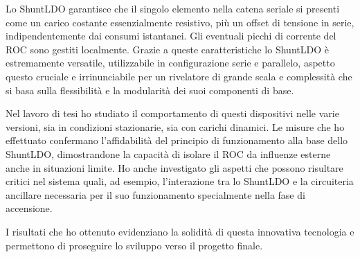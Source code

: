 \documentclass[a4paper,12pt,italian]{article}
\begin{document}
Lo ShuntLDO garantisce che il singolo elemento nella catena seriale si presenti come un carico costante essenzialmente resistivo, pi\`u un offset di tensione in serie, indipendentemente dai consumi istantanei. Gli eventuali picchi di corrente del ROC sono gestiti localmente.
Grazie a queste caratteristiche lo ShuntLDO \`e estremamente versatile, utilizzabile in configurazione serie e parallelo, aspetto questo cruciale e irrinunciabile per un rivelatore di grande scala e complessit\`a che si basa sulla flessibilit\`a e la modularit\`a dei suoi componenti di base.

 

Nel lavoro di tesi ho studiato il comportamento di questi dispositivi nelle varie versioni, sia in condizioni stazionarie, sia con carichi dinamici.
Le misure che ho effettuato confermano l'affidabilità del principio di funzionamento alla base dello ShuntLDO, dimostrandone la capacità di isolare il ROC da influenze esterne anche in situazioni limite. Ho anche investigato gli aspetti che possono risultare critici nel sistema quali, ad esempio, l'interazione tra lo ShuntLDO e la circuiteria ancillare necessaria per il suo funzionamento specialmente nella fase di accensione.

I risultati che ho ottenuto evidenziano la solidit\`a di questa innovativa tecnologia e permettono di proseguire lo sviluppo verso il progetto finale.
\end{document}
